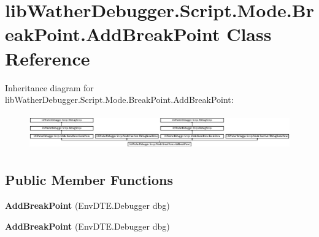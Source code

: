 \hypertarget{classlib_wather_debugger_1_1_script_1_1_mode_1_1_break_point_1_1_add_break_point}{\section{lib\+Wather\+Debugger.\+Script.\+Mode.\+Break\+Point.\+Add\+Break\+Point Class Reference}
\label{classlib_wather_debugger_1_1_script_1_1_mode_1_1_break_point_1_1_add_break_point}
}
Inheritance diagram for lib\+Wather\+Debugger.\+Script.\+Mode.\+Break\+Point.\+Add\+Break\+Point\+:\begin{figure}[H]
\begin{center}
\leavevmode
\includegraphics[height=1.551247cm]{classlib_wather_debugger_1_1_script_1_1_mode_1_1_break_point_1_1_add_break_point}
\end{center}
\end{figure}
\subsection*{Public Member Functions}
\begin{DoxyCompactItemize}
\item 
\hypertarget{classlib_wather_debugger_1_1_script_1_1_mode_1_1_break_point_1_1_add_break_point_ad586139d68748bbd09660fb369ecd096}{{\bfseries Add\+Break\+Point} (Env\+D\+T\+E.\+Debugger dbg)}\label{classlib_wather_debugger_1_1_script_1_1_mode_1_1_break_point_1_1_add_break_point_ad586139d68748bbd09660fb369ecd096}

\item 
\hypertarget{classlib_wather_debugger_1_1_script_1_1_mode_1_1_break_point_1_1_add_break_point_ad586139d68748bbd09660fb369ecd096}{{\bfseries Add\+Break\+Point} (Env\+D\+T\+E.\+Debugger dbg)}\label{classlib_wather_debugger_1_1_script_1_1_mode_1_1_break_point_1_1_add_break_point_ad586139d68748bbd09660fb369ecd096}

\end{DoxyCompactItemize}
